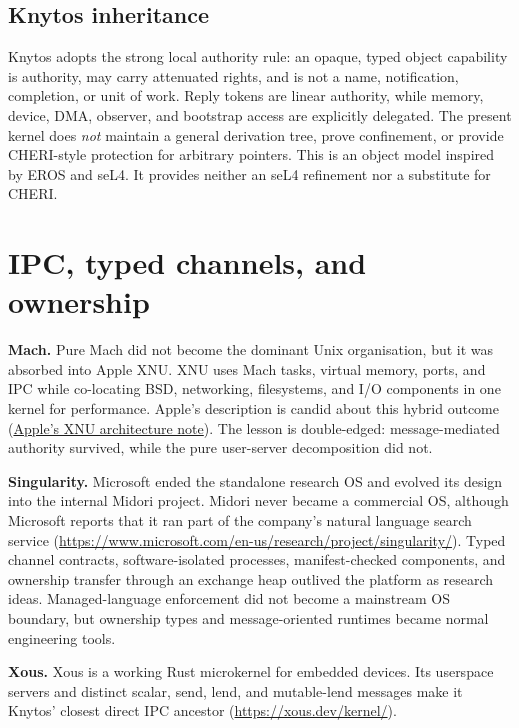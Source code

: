 \subsection{Knytos inheritance}

Knytos adopts the strong local authority rule: an opaque, typed object
capability is authority, may carry attenuated rights, and is not a name,
notification, completion, or unit of work. Reply tokens are linear authority, while
memory, device, DMA, observer, and bootstrap access are explicitly delegated.
The present kernel does \emph{not} maintain a general derivation tree, prove
confinement, or provide CHERI-style protection for arbitrary pointers. This is
an object model inspired by EROS and seL4. It provides neither an seL4
refinement nor a substitute for CHERI.

\section{IPC, typed channels, and ownership}

\textbf{Mach.} Pure Mach did not become the dominant Unix organisation, but
it was absorbed into Apple XNU. XNU uses Mach tasks, virtual memory, ports,
and IPC while co-locating BSD, networking, filesystems, and I/O components in
one kernel for performance. Apple's description is candid about this hybrid
outcome
(\href{https://developer.apple.com/library/archive/documentation/Porting/Conceptual/PortingUnix/additionalfeatures/additionalfeatures.html}{Apple's
XNU architecture note}).
The lesson is double-edged: message-mediated authority survived, while the
pure user-server decomposition did not.

\textbf{Singularity.} Microsoft ended the standalone research OS and evolved
its design into the internal Midori project. Midori never became a commercial
OS, although Microsoft reports that it ran part of the company's natural
language search service
(\url{https://www.microsoft.com/en-us/research/project/singularity/}). Typed
channel contracts, software-isolated processes, manifest-checked components,
and ownership transfer through an exchange heap outlived the platform as
research ideas. Managed-language enforcement did not become a mainstream OS
boundary, but ownership types and message-oriented runtimes became normal
engineering tools.

\textbf{Xous.} Xous is a working Rust microkernel for embedded devices.
Its userspace servers and distinct scalar,
send, lend, and mutable-lend messages make it Knytos' closest direct IPC
ancestor (\url{https://xous.dev/kernel/}).

